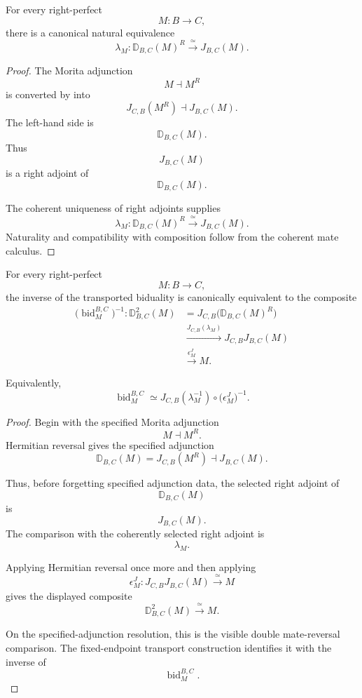 \begin{lemma}
\label{lem:transported-dual-right-adjoint}
For every right-perfect
\[
    M
    \colon
    B
    \longrightarrow
    C,
\]
there is a canonical natural equivalence
\[
    \lambda_M
    \colon
    \mathbb D_{B,C}(M)^R
    \xrightarrow{\;\simeq\;}
    J_{B,C}(M).
\]
\end{lemma}

\begin{proof}
The Morita adjunction
\[
    M
    \dashv
    M^R
\]
is converted by
into
\[
    J_{C,B}(M^R)
    \dashv
    J_{B,C}(M).
\]
The left-hand side is
\[
    \mathbb D_{B,C}(M).
\]
Thus
\[
    J_{B,C}(M)
\]
is a right adjoint of
\[
    \mathbb D_{B,C}(M).
\]

The coherent uniqueness of right adjoints supplies
\[
    \lambda_M
    \colon
    \mathbb D_{B,C}(M)^R
    \xrightarrow{\;\simeq\;}
    J_{B,C}(M).
\]
Naturality and compatibility with composition follow from the coherent
mate calculus.
\end{proof}

\begin{proposition}
\label{prop:explicit-transported-biduality}
For every right-perfect
\[
    M
    \colon
    B
    \longrightarrow
    C,
\]
the inverse of the transported biduality is canonically equivalent to
the composite
\[
\begin{aligned}
    \bigl(
        \operatorname{bid}^{B,C}_M
    \bigr)^{-1}
    \colon
    \mathbb D_{B,C}^2(M)
    &=
    J_{C,B}
    \bigl(
        \mathbb D_{B,C}(M)^R
    \bigr)
    \\
    &\xrightarrow{
        J_{C,B}(\lambda_M)
    }
    J_{C,B}J_{B,C}(M)
    \\
    &\xrightarrow{\epsilon^J_M}
    M.
\end{aligned}
\]

Equivalently,
\[
    \operatorname{bid}^{B,C}_M
    \simeq
    J_{C,B}(\lambda_M^{-1})
    \circ
    \bigl(
        \epsilon^J_M
    \bigr)^{-1}.
\]
\end{proposition}

\begin{proof}
Begin with the specified Morita adjunction
\[
    M
    \dashv
    M^R.
\]
Hermitian reversal gives the specified adjunction
\[
    \mathbb D_{B,C}(M)
    =
    J_{C,B}(M^R)
    \dashv
    J_{B,C}(M).
\]

Thus, before forgetting specified adjunction data, the selected right
adjoint of
\[
    \mathbb D_{B,C}(M)
\]
is
\[
    J_{B,C}(M).
\]
The comparison with the coherently selected right adjoint is
\[
    \lambda_M.
\]

Applying Hermitian reversal once more and then applying
\[
    \epsilon^J_M
    \colon
    J_{C,B}J_{B,C}(M)
    \xrightarrow{\;\simeq\;}
    M
\]
gives the displayed composite
\[
    \mathbb D_{B,C}^2(M)
    \xrightarrow{\;\simeq\;}
    M.
\]

On the specified-adjunction resolution, this is the visible double
mate-reversal comparison. The fixed-endpoint transport construction
identifies it with the inverse of
\[
    \operatorname{bid}^{B,C}_M.
\]
\end{proof}

